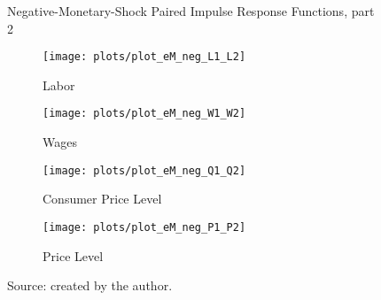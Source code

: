 \documentclass[../thesis.tex]{subfiles}
\begin{document}
\begin{figure}[h!]
	\centering
	\caption*{Negative-Monetary-Shock Paired Impulse Response Functions, part 2}
	\begin{subfigure}[b]{0.48\textwidth}
		\centering
		\texttt{[image: plots/plot\_eM\_neg\_L1\_L2]}
		\caption{\scriptsize Labor}
		\label{fig:plot_eM_neg_L1_L2}
	\end{subfigure}
	\hspace*{0.3cm}
	\begin{subfigure}[b]{0.48\textwidth}
		\centering
		\texttt{[image: plots/plot\_eM\_neg\_W1\_W2]}
		\caption{\scriptsize Wages}
		\label{fig:plot_eM_neg_W1_W2}
	\end{subfigure}
	\vspace*{0.1cm}
	\begin{subfigure}[b]{0.48\textwidth}
		\centering
		\texttt{[image: plots/plot\_eM\_neg\_Q1\_Q2]}
		\caption{\scriptsize Consumer Price Level}
		\label{fig:plot_eM_neg_Q1_Q2}
	\end{subfigure}
	\hspace*{0.3cm}
	\begin{subfigure}[b]{0.48\textwidth}
		\centering
		\texttt{[image: plots/plot\_eM\_neg\_P1\_P2]}
		\caption{\scriptsize Price Level}
		\label{fig:plot_eM_neg_P1_P2}
	\end{subfigure}
	\caption*{Source: created by the author.}
	\label{fig:paired-neg-irf2}
\end{figure}
\end{document}
